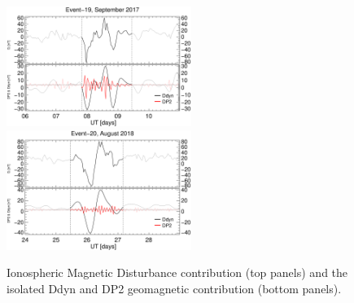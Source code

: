 \documentclass[a4paper,fleqn]{cas-dc}
\begin{document}
\begin{figure}[h!]
       \centerline{\Large \bf   
      \hspace{0.275\textwidth}  \color{black}{}
       \hspace{0.295\textwidth}  \color{black}{}
         \hfill}
       \includegraphics[width=6.0cm]{images/diono/iono_PI_V1_2017-09-06.eps}     
       \includegraphics[width=6.0cm]{images/diono/iono_PI_V1_2018-08-24.eps}
       
       \caption{Ionospheric Magnetic Disturbance contribution (top panels) and the isolated Ddyn and DP2 geomagnetic contribution (bottom panels).}
    \label{fig:iono_resp3}
\end{figure}
\end{document}
